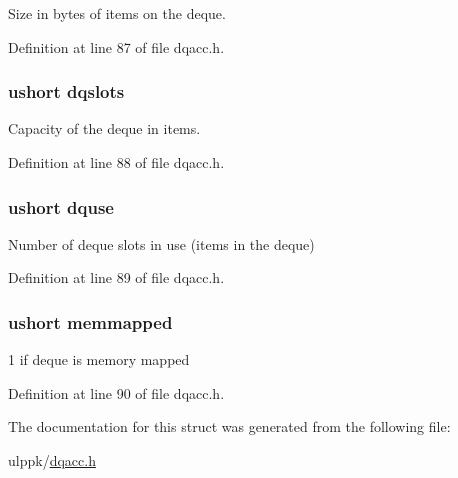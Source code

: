 Size in bytes of items on the deque. 



Definition at line 87 of file dqacc.\-h.

\hypertarget{struct__dq__statbuff_a569a481b9cdc53a7e96804a51643e504}{
\subsubsection[{dqslots}]{\setlength{\rightskip}{0pt plus 5cm}ushort dqslots}}\label{struct__dq__statbuff_a569a481b9cdc53a7e96804a51643e504}


Capacity of the deque in items. 



Definition at line 88 of file dqacc.\-h.

\hypertarget{struct__dq__statbuff_a2fdb1d169ae74820026e2897a3dec9a3}{
\subsubsection[{dquse}]{\setlength{\rightskip}{0pt plus 5cm}ushort dquse}}\label{struct__dq__statbuff_a2fdb1d169ae74820026e2897a3dec9a3}


Number of deque slots in use (items in the deque) 



Definition at line 89 of file dqacc.\-h.

\hypertarget{struct__dq__statbuff_a738331e6f1d54405b568a4c032f8c8eb}{
\subsubsection[{memmapped}]{\setlength{\rightskip}{0pt plus 5cm}ushort memmapped}}\label{struct__dq__statbuff_a738331e6f1d54405b568a4c032f8c8eb}


1 if deque is memory mapped 



Definition at line 90 of file dqacc.\-h.



The documentation for this struct was generated from the following file\-:\begin{DoxyCompactItemize}
\item 
ulppk/\hyperlink{dqacc_8h}{dqacc.\-h}\end{DoxyCompactItemize}
